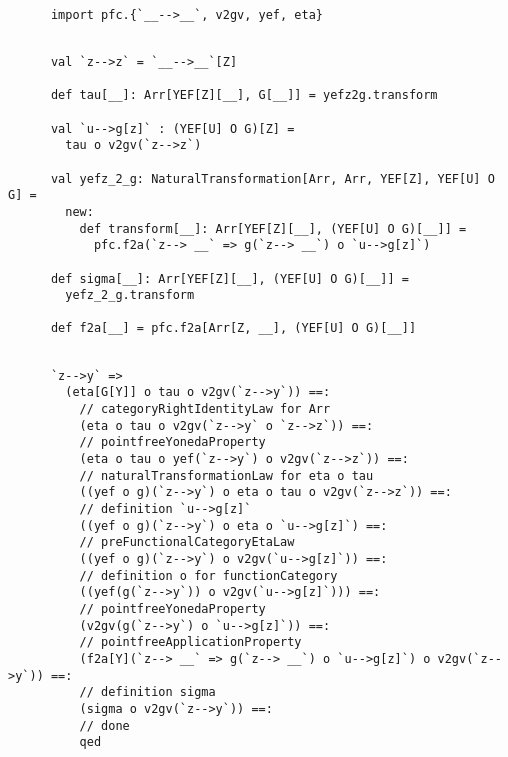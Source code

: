 \documentclass[11pt]{article}
\begin{document}
\vspace{6pt}
\begin{mdframed}[backgroundcolor=lightgray!20] 
\begin{lstlisting}
  
      import pfc.{`__-->__`, v2gv, yef, eta}
\end{lstlisting}
\end{mdframed}
\vspace{6pt}
\begin{mdframed}[backgroundcolor=lightgray!20] 
\begin{lstlisting}

      val `z-->z` = `__-->__`[Z]

      def tau[__]: Arr[YEF[Z][__], G[__]] = yefz2g.transform

      val `u-->g[z]` : (YEF[U] O G)[Z] =
        tau o v2gv(`z-->z`)

      val yefz_2_g: NaturalTransformation[Arr, Arr, YEF[Z], YEF[U] O G] =
        new:
          def transform[__]: Arr[YEF[Z][__], (YEF[U] O G)[__]] =
            pfc.f2a(`z--> __` => g(`z--> __`) o `u-->g[z]`)

      def sigma[__]: Arr[YEF[Z][__], (YEF[U] O G)[__]] =
        yefz_2_g.transform

      def f2a[__] = pfc.f2a[Arr[Z, __], (YEF[U] O G)[__]]
\end{lstlisting}
\end{mdframed}
\vspace{6pt}
\begin{mdframed}[backgroundcolor=lightgray!20] 
\begin{lstlisting}

      `z-->y` =>
        (eta[G[Y]] o tau o v2gv(`z-->y`)) ==:
          // categoryRightIdentityLaw for Arr
          (eta o tau o v2gv(`z-->y` o `z-->z`)) ==:
          // pointfreeYonedaProperty
          (eta o tau o yef(`z-->y`) o v2gv(`z-->z`)) ==:
          // naturalTransformationLaw for eta o tau
          ((yef o g)(`z-->y`) o eta o tau o v2gv(`z-->z`)) ==:
          // definition `u-->g[z]`
          ((yef o g)(`z-->y`) o eta o `u-->g[z]`) ==:
          // preFunctionalCategoryEtaLaw
          ((yef o g)(`z-->y`) o v2gv(`u-->g[z]`)) ==:
          // definition o for functionCategory
          ((yef(g(`z-->y`)) o v2gv(`u-->g[z]`))) ==:
          // pointfreeYonedaProperty
          (v2gv(g(`z-->y`) o `u-->g[z]`)) ==:
          // pointfreeApplicationProperty
          (f2a[Y](`z--> __` => g(`z--> __`) o `u-->g[z]`) o v2gv(`z-->y`)) ==:
          // definition sigma
          (sigma o v2gv(`z-->y`)) ==:
          // done
          qed
\end{lstlisting}
\end{mdframed}
\end{document}

